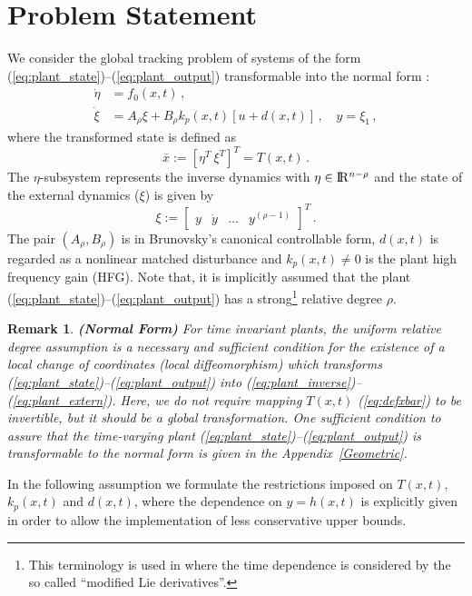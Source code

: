 \documentclass{rncauth}
\newtheorem{remark}{Remark}
\def\re{{\rm I}\! {\rm R}}
\begin{document}
\section{Problem Statement}
\label{sec:problem_statement}

We consider the global tracking problem of systems of the form
(\ref{eq:plant_state})--(\ref{eq:plant_output}) transformable into
the normal form \cite{K:02}:
%
\begin{align}
    \dot{\eta} &= f_0(x,t)\,, \label{eq:plant_inverse} \\
    \dot{\xi}  &= A_\rho \xi+B_\rho k_p(x,t) [u+d(x,t)]\,, \quad y
= \xi_1\,,\label{eq:plant_extern}
\end{align}
%
where the transformed state is defined as
%
\begin{equation}
\bar{x}:=[\eta^T \ \xi^T]^T=T(x,t)\,.\label{eq:defxbar}
\end{equation}
%
The $\eta$-subsystem represents the inverse dynamics with $\eta
\in \re^{n-\rho}$ and the state of the external dynamics ($\xi$)
is given by
%
\begin{equation}
\xi\!:=\![\begin{array}{cccc}y & \dot{y} & \ldots
&y^{(\rho-1)}\end{array}]^T\,.\label{eq:defxi}
\end{equation}
%
The pair $(A_\rho,B_\rho)$ is in Brunovsky's canonical
controllable form, $d(x,t)$ is regarded as a nonlinear matched
disturbance and $k_p(x,t)\neq 0$ is the plant high frequency gain
(HFG). Note that, it is implicitly assumed that the plant
(\ref{eq:plant_state})--(\ref{eq:plant_output}) has a
strong\footnote{This terminology is used in \cite{DP:01} where the
time dependence is considered by the so called ``modified Lie
derivatives''.} relative degree $\rho$.

\begin{remark}\label{remark1} \emph{\textbf{(Normal Form)}}
For time invariant plants, the uniform relative degree assumption
\cite{K:02,I:95} is a necessary and sufficient condition for the
existence of a local change of coordinates (local diffeomorphism)
which transforms (\ref{eq:plant_state})--(\ref{eq:plant_output})
into (\ref{eq:plant_inverse})--(\ref{eq:plant_extern}). Here, we do
not require mapping $T(x,t)$ (\ref{eq:defxbar}) to be invertible,
but it should be a global transformation. One sufficient condition
to assure that the \emph{time-varying} plant
(\ref{eq:plant_state})--(\ref{eq:plant_output}) is transformable to
the normal form is given in the
Appendix~\ref{Geometric}. \end{remark}
%
In the following assumption we formulate the restrictions imposed
on $T(x,t)$, $k_p(x,t)$ and $d(x,t)$, where the dependence on
$y=h(x,t)$ is explicitly given in order to allow the
implementation of less conservative upper bounds.
\end{document}
